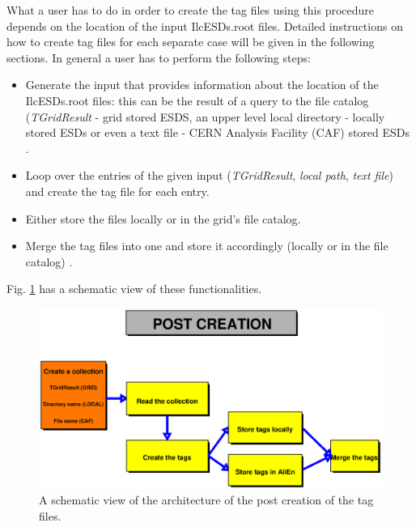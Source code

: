 \documentclass[12pt,a4paper,twoside]{article}
\begin{document}
{\begin{itemize}
\end{itemize}

What a user has to do in order to create the tag files using this
procedure depends on the location of the input IlcESDs.root
files. Detailed instructions on how to create tag files for each
separate case will be given in the following sections. In general a
user has to perform the following steps:

\begin{itemize}

\item Generate the input that provides information about the location
  of the IlcESDs.root files: this can be the result of a query to the
  file catalog (\emph{TGridResult} \cite{RootTGridResult} - grid
  stored ESDS, an upper level local directory - locally stored ESDs or
  even a text file - CERN Analysis Facility (CAF) stored ESDs
  \cite{CAF}.

\item Loop over the entries of the given input (\emph{TGridResult},
  \emph{local path}, \emph{text file}) and create the tag file for
  each entry.

\item Either store the files locally or in the grid's file catalog.

\item Merge the tag files into one and store it accordingly (locally
  or in the file catalog) \cite{RootApi}.

\end{itemize}

Fig. \ref{posttag} has a schematic view of these functionalities.


\begin{figure}[ht!]
   \centering
   \includegraphics[width=15cm]{picts/tagpost}
   \caption{A schematic view of the architecture of the post creation of the tag files.}
   \label{posttag}
\end{figure}

}
\end{document}
